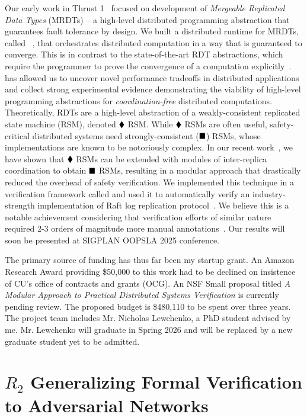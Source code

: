  Our early work in Thrust
1~\cite{mrdt, snapl19, quark} focused on development of \emph{Mergeable
Replicated Data Types} (MRDTs) -- a high-level distributed programming
abstraction that guarantees fault tolerance by design. We built a
distributed runtime for MRDTs, called \quark~\cite{quark}, that
orchestrates distributed computation in a way that is guaranteed to
converge. This is in contrast to the state-of-the-art RDT abstractions,
which require the programmer to prove the convergence of a computation
explicitly~\cite{crdt}. \quark has allowed us to uncover novel performance
tradeoffs in distributed applications and collect strong experimental
evidence demonstrating the viability of high-level programming abstractions
for \emph{coordination-free} distributed computations. Theoretically, RDTs
are a high-level abstraction of a weakly-consistent replicated state
machine (RSM), denoted $\blacklozenge$ RSM. While $\blacklozenge$ RSMs are often
useful, safety-critical distributed systems need strongly-consistent
($\blacksquare$) RSMs, whose implementations are known to be notoriously
complex. In our recent work~\cite{lewchenko-oopsla25}, we have shown that
$\blacklozenge$ RSMs can be extended with modules of inter-replica coordination
to obtain $\blacksquare$ RSMs, resulting in a modular approach that drastically
reduced the overhead of safety verification. We implemented this technique
in a verification framework called \superv and used it to automatically
verify an industry-strength implementation of Raft log replication
protocol~\cite{raft}. We believe this is a notable achievement considering
that verification efforts of similar nature required 2-3 orders of
magnitude more manual annotations~\cite{VerdiRaft}. Our results will soon
be presented at SIGPLAN OOPSLA 2025 conference. 

 The primary source of funding has
thus far been my startup grant. An Amazon Research Award providing \$50,000
to this work had to be declined on insistence of CU's office of contracts
and grants (OCG). An NSF Small proposal titled \emph{A  Modular Approach to
Practical Distributed Systems Veriﬁcation} is currently pending review. The
proposed budget is \$480,110 to be spent over three years. The project team
includes Mr. Nicholas Lewchenko, a PhD student advised by me. Mr. Lewchenko
will graduate in Spring 2026 and will be replaced by a new graduate student
yet to be admitted. 

\section*{$R_2$ Generalizing Formal Verification to Adversarial Networks}

